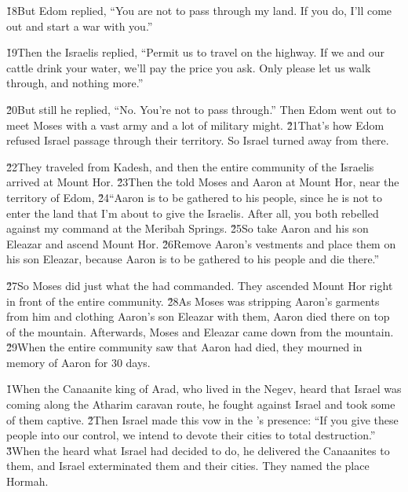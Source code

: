 \v{18}But Edom replied, ``You are not to pass through my land. If you do, I'll come out and start a war with you.''

\v{19}Then the Israelis replied, ``Permit us to travel on the highway. If we and our cattle drink your water, we'll pay the price you ask. Only please let us walk through, and nothing more.''

\v{20}But still he replied, ``No. You're not to pass through.'' Then Edom went out to meet Moses with a vast army and a lot of military might. \v{21}That's how Edom refused Israel passage through their territory. So Israel turned away from there.

\v{22}They traveled from Kadesh, and then the entire community of the Israelis arrived at Mount Hor. \v{23}Then the  told Moses and Aaron at Mount Hor, near the territory of Edom, \v{24}``Aaron is to be gathered to his people, since he is not to enter the land that I'm about to give the Israelis. After all, you both rebelled against my command at the Meribah Springs. \v{25}So take Aaron and his son Eleazar and ascend Mount Hor. \v{26}Remove Aaron's vestments and place them on his son Eleazar, because Aaron is to be gathered to his people and die there.''

\v{27}So Moses did just what the  had commanded. They ascended Mount Hor right in front of the entire community. \v{28}As Moses was stripping Aaron's garments from him and clothing Aaron's son Eleazar with them, Aaron died there on top of the mountain. Afterwards, Moses and Eleazar came down from the mountain. \v{29}When the entire community saw that Aaron had died, they mourned in memory of Aaron for 30 days.

\v{1}When the Canaanite king of Arad, who lived in the Negev, heard that Israel was coming along the Atharim caravan route, he fought against Israel and took some of them captive. \v{2}Then Israel made this vow in the 's presence: ``If you give these people into our control, we intend to devote their cities to total destruction.'' \v{3}When the  heard what Israel had decided to do, he delivered the Canaanites to them, and Israel exterminated them and their cities. They named the place Hormah.

